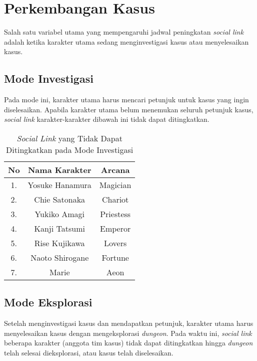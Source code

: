 \section{Perkembangan Kasus}
Salah satu variabel utama yang mempengaruhi jadwal peningkatan \textit{social link} adalah ketika karakter utama sedang menginvestigasi kasus atau menyelesaikan kasus.

\subsection{Mode Investigasi}
Pada mode ini, karakter utama harus mencari petunjuk untuk kasus yang ingin diselesaikan. Apabila karakter utama belum menemukan seluruh petunjuk kasus, \textit{social link} karakter-karakter dibawah ini tidak dapat ditingkatkan.
\begin{table}[htb]
    \begin{center}
        \begin{tabular}{ | c | c | c |}
            \hline
            No & Nama Karakter   & Arcana    \\
            \hline
            1. & Yosuke Hanamura & Magician  \\
            \hline
            2. & Chie Satonaka   & Chariot   \\
            \hline
            3. & Yukiko Amagi    & Priestess \\
            \hline
            4. & Kanji Tatsumi   & Emperor   \\
            \hline
            5. & Rise Kujikawa   & Lovers    \\
            \hline
            6. & Naoto Shirogane & Fortune   \\
            \hline
            7. & Marie           & Aeon      \\
            \hline
        \end{tabular}
    \end{center}
    \caption{\textit{Social Link} yang Tidak Dapat Ditingkatkan pada Mode Investigasi}
\end{table}

\subsection{Mode Eksplorasi}
Setelah menginvestigasi kasus dan mendapatkan petunjuk, karakter utama harus menyelesaikan kasus dengan mengeksplorasi \textit{dungeon}. Pada waktu ini, \textit{social link} beberapa karakter (anggota tim kasus) tidak dapat ditingkatkan hingga \textit{dungeon} telah selesai dieksplorasi, atau kasus telah diselesaikan.

